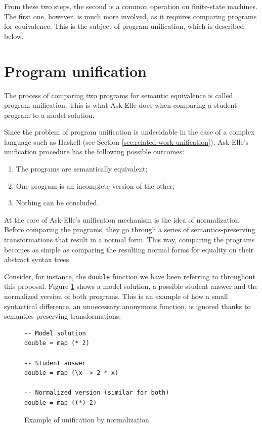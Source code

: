 From these two steps, the second is a common operation on finite-state machines. The first one, however, is much more involved, as it requires comparing programs for equivalence. This is the subject of program unification, which is described below.

\section{Program unification}

The process of comparing two programs for semantic equivalence is called program unification. This is what Ask-Elle does when comparing a student program to a model solution.

Since the problem of program unification is undecidable in the case of a complex language such as Haskell (see Section \ref{sec:related-work-unification}), Ask-Elle's unification procedure has the following possible outcomes:

\begin{enumerate}
    \item The programs are semantically equivalent;
    \item One program is an incomplete version of the other;
    \item Nothing can be concluded.
\end{enumerate}

At the core of Ask-Elle's unification mechanism is the idea of normalization. Before comparing the programs, they go through a series of semantics-preserving transformations that result in a normal form. This way, comparing the programs becomes as simple as comparing the resulting normal forms for equality on their abstract syntax trees.

Consider, for instance, the \texttt{double} function we have been referring to throughout this proposal. Figure \ref{fig:bg-unification-normalization} shows a model solution, a possible student answer and the normalized version of both programs. This is an example of how a small syntactical difference, an unnecessary anonymous function, is ignored thanks to semantics-preserving transformations.

\begin{figure}[H]
\begin{verbatim}
-- Model solution
double = map (* 2)

-- Student answer
double = map (\x -> 2 * x)

-- Normalized version (similar for both)
double = map ((*) 2)
\end{verbatim}
\caption{Example of unification by normalization}
\label{fig:bg-unification-normalization}
\end{figure}
